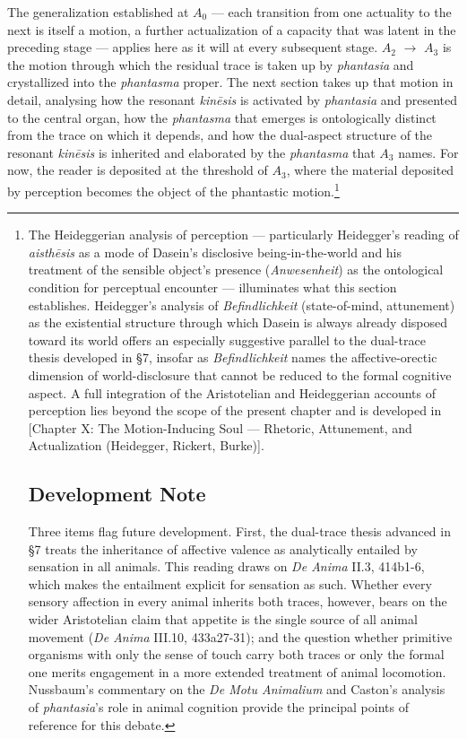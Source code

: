 \documentclass[12pt]{article}
\begin{document}
The generalization established at $A_0$ --- each transition from one actuality to the next is itself a motion, a further actualization of a capacity that was latent in the preceding stage --- applies here as it will at every subsequent stage. $A_2$ $\to$ $A_3$ is the motion through which the residual trace is taken up by \textit{phantasia} and crystallized into the \textit{phantasma} proper. The next section takes up that motion in detail, analysing how the resonant \textit{kinēsis} is activated by \textit{phantasia} and presented to the central organ, how the \textit{phantasma} that emerges is ontologically distinct from the trace on which it depends, and how the dual-aspect structure of the resonant \textit{kinēsis} is inherited and elaborated by the \textit{phantasma} that $A_3$ names. For now, the reader is deposited at the threshold of $A_3$, where the material deposited by perception becomes the object of the phantastic motion.\footnote{The Heideggerian analysis of perception --- particularly Heidegger's reading of \textit{aisthēsis} as a mode of Dasein's disclosive being-in-the-world and his treatment of the sensible object's presence (\textit{Anwesenheit}) as the ontological condition for perceptual encounter --- illuminates what this section establishes. Heidegger's analysis of \textit{Befindlichkeit} (state-of-mind, attunement) as the existential structure through which Dasein is always already disposed toward its world offers an especially suggestive parallel to the dual-trace thesis developed in §7, insofar as \textit{Befindlichkeit} names the affective-orectic dimension of world-disclosure that cannot be reduced to the formal cognitive aspect. A full integration of the Aristotelian and Heideggerian accounts of perception lies beyond the scope of the present chapter and is developed in [Chapter X: The Motion-Inducing Soul --- Rhetoric, Attunement, and Actualization (Heidegger, Rickert, Burke)].

\subsection*{Development Note}

Three items flag future development. First, the dual-trace thesis advanced in §7 treats the inheritance of affective valence as analytically entailed by sensation in all animals. This reading draws on \textit{De Anima} II.3, 414b1-6, which makes the entailment explicit for sensation as such. Whether every sensory affection in every animal inherits both traces, however, bears on the wider Aristotelian claim that appetite is the single source of all animal movement (\textit{De Anima} III.10, 433a27-31); and the question whether primitive organisms with only the sense of touch carry both traces or only the formal one merits engagement in a more extended treatment of animal locomotion. Nussbaum's commentary on the \textit{De Motu Animalium} and Caston's analysis of \textit{phantasia}'s role in animal cognition provide the principal points of reference for this debate.

}
\end{document}
